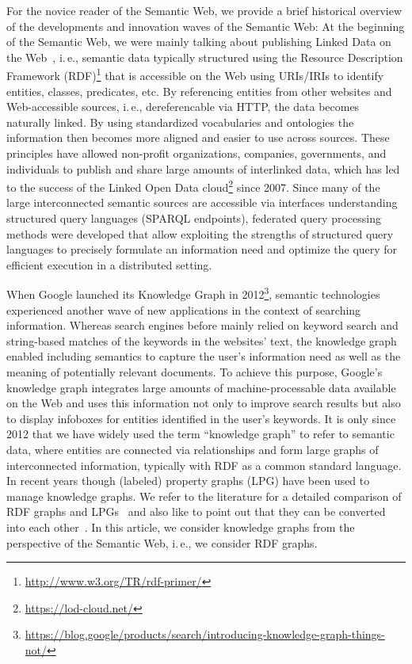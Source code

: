 \documentclass[a4paper,USenglish]{tgdk-v2021}
\begin{document}
For the novice reader of the Semantic Web, we provide a brief historical overview of the developments and innovation waves of the Semantic Web:
At the beginning of the Semantic Web, we were mainly talking about publishing Linked Data on the Web~\cite{DBLP:books/crc/linked2014}, i.\,e., semantic data typically structured using the Resource Description Framework (RDF)\footnote{\url{http://www.w3.org/TR/rdf-primer/}} that is accessible on the Web using URIs/IRIs to identify entities, classes, predicates, etc.
By referencing entities from other websites and Web-accessible sources, i.\,e., dereferencable via HTTP, the data becomes naturally linked. 
By using standardized vocabularies and ontologies the information then becomes more aligned and easier to use across sources. 
These principles have allowed non-profit organizations, companies, governments, and individuals to publish and share large amounts of interlinked data, which has led to the success of the Linked Open Data cloud\footnote{\url{https://lod-cloud.net/}} since 2007. 
Since many of the large interconnected semantic sources are accessible via interfaces understanding structured query languages (SPARQL endpoints), federated query processing methods were developed that allow exploiting the strengths of structured query languages to precisely formulate an information need and optimize the query for efficient execution in a distributed setting.

When Google launched its Knowledge Graph in 2012\footnote{\url{https://blog.google/products/search/introducing-knowledge-graph-things-not/}}, semantic technologies experienced another wave of new applications in the context of searching information.
Whereas search engines before mainly relied on keyword search and string-based matches of the keywords in the websites' text, the knowledge graph enabled including semantics to capture the user's information need as well as the meaning of potentially relevant documents. 
To achieve this purpose, Google's knowledge graph integrates large amounts of machine-processable data available on the Web and uses this information not only to improve search results but also to display infoboxes for entities identified in the user's keywords. 
It is only since 2012 that we have widely used the term ``knowledge graph'' to refer to semantic data, where entities are connected via relationships and form large graphs of interconnected information, typically with RDF as a common standard language.
In recent years though (labeled) property graphs (LPG) have been used to manage knowledge graphs.
We refer to the literature for a detailed comparison of RDF graphs and LPGs~\cite{DBLP:journals/corr/abs-2003-02320} and also like to point out that they can be converted into each other~\cite{DBLP:phd/dnb/Blume22}.
In this article, we consider knowledge graphs from the perspective of the Semantic Web, i.\,e., we consider RDF graphs.
\end{document}
